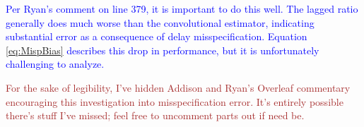 \documentclass{article}
\newcommand{\ahcomment}[1]{{\color{red}[AH: #1]}}
\begin{document}
\textcolor{blue}{Per Ryan's comment on line 379, it is important to do this well. The lagged ratio generally does much worse than the convolutional estimator, indicating substantial error as a consequence of delay misspecification. Equation \ref{eq:MispBias} describes this drop in performance, but it is unfortunately challenging to analyze. 
}




\textcolor{brown}{For the sake of legibility, I've hidden Addison and Ryan's Overleaf commentary encouraging this investigation into misspecification error. It's entirely possible there's stuff I've missed; feel free to uncomment parts out if need be.}





\end{document}
